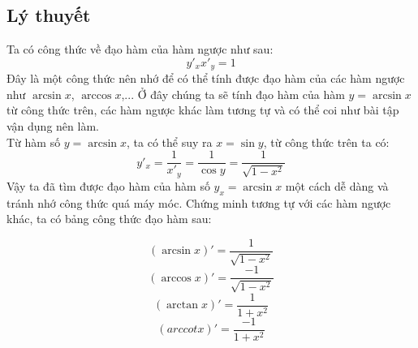 \subsection{Lý thuyết}
Ta có công thức về đạo hàm của hàm ngược như sau:
$$y'_{x}x'_{y}=1$$
Đây là một công thức nên nhớ để có thể tính được đạo hàm của các hàm ngược như $\arcsin{x}$, $\arccos{x}$,... Ở đây chúng ta sẽ tính đạo hàm của hàm $y=\arcsin{x}$ từ công thức trên, các hàm ngược khác làm tương tự và có thể coi như bài tập vận dụng nên làm.
\\ Từ hàm số $y=\arcsin{x}$, ta có thể suy ra $x=\sin{y}$, từ công thức trên ta có:
$$y'_{x}=\frac{1}{x'_{y}}=\frac{1}{\cos{y}}=\frac{1}{\sqrt{1-x^2}}$$
Vậy ta đã tìm được đạo hàm của hàm số $y_{x}=\arcsin{x}$ một cách dễ dàng và tránh nhớ công thức quá máy móc. Chứng minh tương tự với các hàm ngược khác, ta có bảng công thức đạo hàm sau:
\begin{tcolorbox}
    \begin{equation}(\arcsin{x})'=\frac{1}{\sqrt{1-x^2}}\end{equation}
    \begin{equation}(\arccos{x})'=\frac{-1}{\sqrt{1-x^2}}\end{equation}
    \begin{equation}(\arctan{x})'=\frac{1}{1+x^2}\end{equation}
    \begin{equation}(arccot{x})'=\frac{-1}{1+x^2}\end{equation}
\end{tcolorbox}
